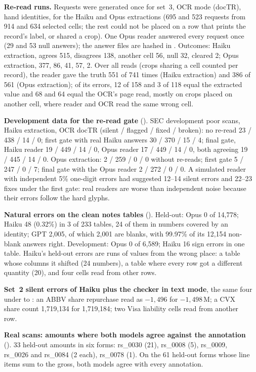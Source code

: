 \textbf{Re-read runs.} Requests were generated once for set~3, OCR mode (docTR), hand identities, for the Haiku and Opus extractions (695 and 523 requests from 914 and 634 selected cells; the rest could not be placed on a row that prints the record's label, or shared a crop). One Opus reader answered every request once (29 and 53 null answers); the answer files are hashed in . Outcomes: Haiku extraction, agrees 515, disagrees 138, another cell 56, null 32, cleared 2; Opus extraction, 377, 86, 41, 57, 2. Over all reads (crops sharing a cell counted per record), the reader gave the truth 551 of 741 times (Haiku extraction) and 386 of 561 (Opus extraction); of its errors, 12 of 158 and 3 of 118 equal the extracted value and 68 and 64 equal the OCR's page read, mostly on crops placed on another cell, where reader and OCR read the same wrong cell.

\textbf{Development data for the re-read gate} (). SEC development poor scans, Haiku extraction, OCR docTR (silent / flagged / fixed / broken): no re-read 23 / 438 / 14 / 0; first gate with real Haiku answers 30 / 370 / 15 / 4; final gate, Haiku reader 19 / 449 / 14 / 0, Opus reader 17 / 449 / 14 / 0, both agreeing 19 / 445 / 14 / 0. Opus extraction: 2 / 259 / 0 / 0 without re-reads; first gate 5 / 247 / 0 / 7; final gate with the Opus reader 2 / 272 / 0 / 0. A simulated reader with independent 5\% one-digit errors had suggested 12--14 silent errors and 22--23 fixes under the first gate: real readers are worse than independent noise because their errors follow the hard glyphs.

\textbf{Natural errors on the clean notes tables} (). Held-out: Opus 0 of 14,778; Haiku 48 (0.32\%) in 3 of 233 tables, 24 of them in numbers covered by an identity; GPT 2,005, of which 2,001 are blanks, with 99.97\% of its 12,154 non-blank answers right. Development: Opus 0 of 6,589; Haiku 16 sign errors in one table. Haiku's held-out errors are runs of values from the wrong place: a table whose columns it shifted (24 numbers), a table where every row got a different quantity (20), and four cells read from other rows.

\textbf{Set~2 silent errors of Haiku plus the checker in text mode}, the same four under  to : an ABBV share repurchase read as $-1{,}496$ for $-1{,}498$\,M; a CVX share count 1,719,134 for 1,719,184; two Visa liability cells read from another row.

\textbf{Real scans: amounts where both models agree against the annotation} (). 33 held-out amounts in six forms: rs\_0030 (21), rs\_0008 (5), rs\_0009, rs\_0026 and rs\_0084 (2 each), rs\_0078 (1). On the 61 held-out forms whose line items sum to the gross, both models agree with every annotation.

